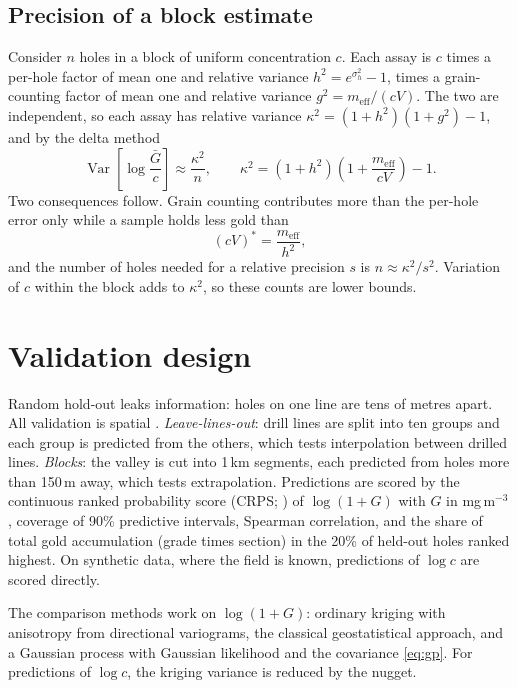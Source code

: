 \documentclass[11pt,a4paper]{article}
\theoremstyle{remark}
\newcommand{\meff}{m_{\mathrm{eff}}}
\newcommand{\Var}{\operatorname{Var}}
\begin{document}
\subsection{Precision of a block estimate}\label{sec:blockrule}

Consider $n$ holes in a block of uniform concentration $c$. Each assay is $c$ times a per-hole factor of mean one and relative variance $h^2 = e^{\sigma_h^2} - 1$, times a grain-counting factor of mean one and relative variance $g^2 = \meff/(cV)$. The two are independent, so each assay has relative variance $\kappa^2 = (1 + h^2)(1 + g^2) - 1$, and by the delta method
\begin{equation}\label{eq:kappa}
\Var\!\left[\log\frac{\bar G}{c}\right] \approx \frac{\kappa^2}{n},
\qquad
\kappa^2 = \left(1 + h^2\right)\left(1 + \frac{\meff}{cV}\right) - 1.
\end{equation}
Two consequences follow. Grain counting contributes more than the per-hole error only while a sample holds less gold than
\begin{equation}\label{eq:crossover}
(cV)^\ast = \frac{\meff}{h^2},
\end{equation}
and the number of holes needed for a relative precision $s$ is $n \approx \kappa^2/s^2$. Variation of $c$ within the block adds to $\kappa^2$, so these counts are lower bounds.

\section{Validation design}\label{sec:validation}

Random hold-out leaks information: holes on one line are tens of metres apart. All validation is spatial \citep{Roberts2017}. \emph{Leave-lines-out}: drill lines are split into ten groups and each group is predicted from the others, which tests interpolation between drilled lines. \emph{Blocks}: the valley is cut into 1\,km segments, each predicted from holes more than 150\,m away, which tests extrapolation. Predictions are scored by the continuous ranked probability score (CRPS; \citealp{Gneiting2007}) of $\log(1 + G)$ with $G$ in mg\,m$^{-3}$, coverage of 90\% predictive intervals, Spearman correlation, and the share of total gold accumulation (grade times section) in the 20\% of held-out holes ranked highest. On synthetic data, where the field is known, predictions of $\log c$ are scored directly.

The comparison methods work on $\log(1 + G)$: ordinary kriging with anisotropy from directional variograms, the classical geostatistical approach, and a Gaussian process with Gaussian likelihood and the covariance \eqref{eq:gp}. For predictions of $\log c$, the kriging variance is reduced by the nugget.
\end{document}
